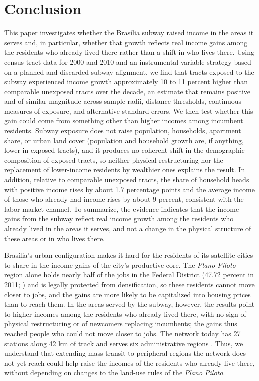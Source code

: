 \section{Conclusion}
\label{s:conclusion}

This paper investigates whether the Brasília subway raised income in the areas it serves and, in particular, whether that growth reflects real income gains among the residents who already lived there rather than a shift in who lives there. Using census-tract data for 2000 and 2010 and an instrumental-variable strategy based on a planned and discarded subway alignment, we find that tracts exposed to the subway experienced income growth approximately 10 to 11 percent higher than comparable unexposed tracts over the decade, an estimate that remains positive and of similar magnitude across sample radii, distance thresholds, continuous measures of exposure, and alternative standard errors. We then test whether this gain could come from something other than higher incomes among incumbent residents. Subway exposure does not raise population, households, apartment share, or urban land cover (population and household growth are, if anything, lower in exposed tracts), and it produces no coherent shift in the demographic composition of exposed tracts, so neither physical restructuring nor the replacement of lower-income residents by wealthier ones explains the result. In addition, relative to comparable unexposed tracts, the share of household heads with positive income rises by about 1.7 percentage points and the average income of those who already had income rises by about 9 percent, consistent with the labor-market channel. To summarize, the evidence indicates that the income gains from the subway reflect real income growth among the residents who already lived in the areas it serves, and not a change in the physical structure of these areas or in who lives there.

Brasília's urban configuration makes it hard for the residents of its satellite cities to share in the income gains of the city's productive core. The \textit{Plano Piloto} region alone holds nearly half of the jobs in the Federal District (47.72 percent in 2011; \citealp{miragaya2013perfil}) and is legally protected from densification, so these residents cannot move closer to jobs, and the gains are more likely to be capitalized into housing prices than to reach them. In the areas served by the subway, however, the results point to higher incomes among the residents who already lived there, with no sign of physical restructuring or of newcomers replacing incumbents; the gains thus reached people who could not move closer to jobs. The network today has 27 stations along 42 km of track and serves six administrative regions \citep{institutomdt2019evolucao}. Thus, we understand that extending mass transit to peripheral regions the network does not yet reach could help raise the incomes of the residents who already live there, without depending on changes to the land-use rules of the \textit{Plano Piloto}.

